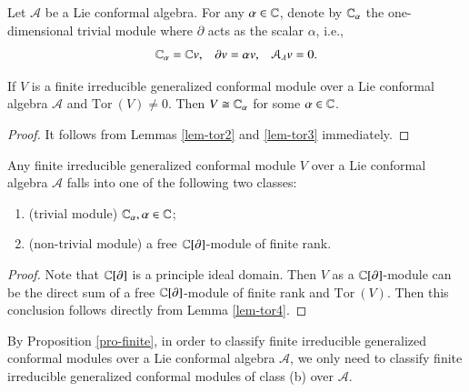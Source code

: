 \documentclass[12pt]{amsart}
\begin{document}
Let $\mathcal{A}$ be a Lie conformal algebra.
For any $\alpha\in\mathbb{C}$, denote by $\mathbb{C}_\alpha$ the one-dimensional trivial module where $\partial$ acts as the scalar $\alpha$, i.e.,
$$\mathbb{C}_\alpha=\mathbb{C} v,\;\;\; \partial v=\alpha v,\;\;\; \mathcal{A}_\lambda v=0.$$
\begin{lem}\label{lem-tor4}If $V$ is a finite irreducible generalized conformal module over a Lie conformal algebra $\mathcal{A}$ and $\text{Tor}~(V)\neq 0$. Then
$V\cong\mathbb{C}_\alpha$ for some $\alpha\in\mathbb{C}$.
\end{lem}
\begin{proof}
It follows from Lemmas \ref{lem-tor2} and \ref{lem-tor3} immediately.
\end{proof}
\begin{pro}\label{pro-finite}
Any finite irreducible generalized conformal module $V$ over a Lie conformal algebra $\mathcal{A}$
falls into one of the following two classes:
\begin{enumerate}
\item (trivial module) $\mathbb{C}_\alpha, \alpha\in\mathbb{C}$;
\item (non-trivial module) a free $\mathbb{C}[\partial]$-module of finite rank.
\end{enumerate}
\end{pro}
\begin{proof}
Note that $\mathbb{C}[\partial]$ is a principle ideal domain. Then $V$ as a $\mathbb{C}[\partial]$-module can be the direct sum of a free $\mathbb{C}[\partial]$-module of finite rank and $\text{Tor}~( V)$. Then this conclusion follows directly from Lemma \ref{lem-tor4}.
\end{proof}

\begin{rmk}
By Proposition \ref{pro-finite}, in order to classify finite irreducible generalized conformal modules over a Lie conformal algebra $\mathcal{A}$, we only need to classify finite irreducible generalized conformal modules of class (b) over $\mathcal{A}$.
\end{rmk}
\end{document}

